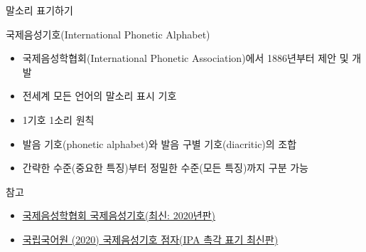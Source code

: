\documentclass[11pt, aspectratio=169]{beamer}
\begin{document}
\begin{frame}[t]{말소리 표기하기}
    \begin{block}{국제음성기호(International Phonetic Alphabet)}
        \begin{itemize}
            \item 국제음성학협회(International Phonetic Association)에서 1886년부터 제안 및 개발
            \item 전세계 모든 언어의 말소리 표시 기호
            \item 1기호 1소리 원칙
            \item 발음 기호(phonetic alphabet)와 발음 구별 기호(diacritic)의 조합
            \item 간략한 수준(중요한 특징)부터 정밀한 수준(모든 특징)까지 구분 가능
        \end{itemize}
    \end{block}
    참고
    \begin{itemize}
        \item {}\href{https://www.internationalphoneticassociation.org/content/ipa-chart}{\underline{국제음성학협회 국제음성기호(최신: 2020년판)}}
        \item {}\href{https://korean.go.kr/front/etcData/etcDataView.do?mn_id=208&etc_seq=670}{\underline{국립국어원 (2020) 국제음성기호 점자(IPA 촉각 표기 최신판)}}
    \end{itemize}
\end{frame}
\end{document}
